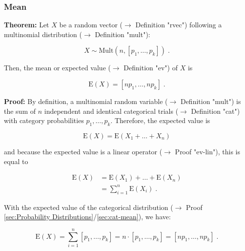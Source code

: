 \documentclass[a4paper,12pt]{book}
\begin{document}
\subsubsection[\textbf{Mean}]{Mean} \label{sec:mult-mean}

\vspace{1em}
\textbf{Theorem:} Let $X$ be a random vector ($\rightarrow$ Definition "rvec") following a multinomial distribution ($\rightarrow$ Definition "mult"):

\begin{equation} \label{eq:mult-mean-mult}
X \sim \mathrm{Mult}(n,\left[p_1, \ldots, p_k \right]) \; .
\end{equation}

Then, the mean or expected value ($\rightarrow$ Definition "ev") of $X$ is

\begin{equation} \label{eq:mult-mean-bin-mean}
\mathrm{E}(X) = \left[n p_1, \ldots, n p_k \right] \; .
\end{equation}


\vspace{1em}
\textbf{Proof:} By definition, a multinomial random variable ($\rightarrow$ Definition "mult") is the sum of $n$ independent and identical categorical trials ($\rightarrow$ Definition "cat") with category probabilities $p_1, \ldots, p_k$. Therefore, the expected value is

\begin{equation} \label{eq:mult-mean-mult-mean-s1}
\mathrm{E}(X) = \mathrm{E}(X_1 + \ldots + X_n)
\end{equation}

and because the expected value is a linear operator ($\rightarrow$ Proof "ev-lin"), this is equal to

\begin{equation} \label{eq:mult-mean-mult-mean-s2}
\begin{split}
\mathrm{E}(X) &= \mathrm{E}(X_1) + \ldots + \mathrm{E}(X_n) \\
&= \sum_{i=1}^{n} \mathrm{E}(X_i) \; .
\end{split}
\end{equation}

With the expected value of the categorical distribution ($\rightarrow$ Proof \ref{sec:Probability Distributions}/\ref{sec:cat-mean}), we have:

\begin{equation} \label{eq:mult-mean-mult-mean-s3}
\mathrm{E}(X) = \sum_{i=1}^{n} \left[p_1, \ldots, p_k \right] = n \cdot \left[p_1, \ldots, p_k \right] = \left[n p_1, \ldots, n p_k \right] \; .
\end{equation}
\end{document}
